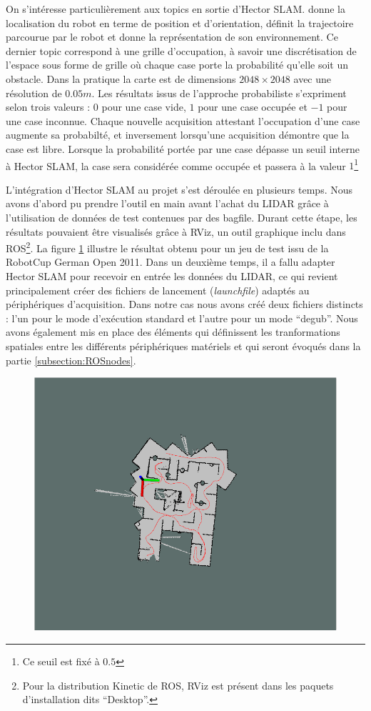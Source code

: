 On s'intéresse particulièrement aux topics en sortie d'\gls{Hector SLAM}. 
 donne la localisation du robot en terme de position et d'orientation,  définit la trajectoire parcourue par le robot et  donne la représentation de son environnement. 
Ce dernier topic correspond à une grille d'occupation, à savoir une discrétisation de l'espace sous forme de grille où chaque case porte la probabilité qu'elle soit un obstacle.
Dans la pratique la carte est de dimensions $2048 \times{2048}$ avec une résolution de $0.05m$. Les résultats issus de l'approche probabiliste s'expriment selon trois valeurs : $0$ pour une case vide, $1$ pour une case occupée et $-1$ pour une case inconnue. 
Chaque nouvelle acquisition attestant l'occupation d'une case augmente sa probabilté, et inversement lorsqu'une acquisition démontre que la case est libre.
Lorsque la probabilité portée par une case dépasse un seuil interne à \gls{Hector SLAM}, la case sera considérée comme occupée et passera à la valeur $1$\footnote{Ce seuil est fixé à $0.5$}

L'intégration d'\gls{Hector SLAM} au projet s'est déroulée en plusieurs temps.
Nous avons d'abord pu prendre l'outil en main avant l'achat du \gls{LIDAR} grâce à l'utilisation de données de test contenues par des \gls{bagfile}. 
Durant cette étape, les résultats pouvaient être visualisés grâce à RViz, un outil graphique inclu dans \gls{ROS}\footnote{Pour la distribution Kinetic de ROS, RViz est présent dans les paquets d'installation dits ``Desktop''\cite{Bib_ROS_install}.}.
La figure \ref{fig:rviz} illustre le résultat obtenu pour un jeu de test issu de la RobotCup German Open 2011. 
Dans un deuxième temps, il a fallu adapter \gls{Hector SLAM} pour recevoir en entrée les données du \gls{LIDAR}, ce qui revient principalement créer des fichiers de lancement (\emph{launchfile})
adaptés au périphériques d'acquisition. Dans notre cas nous avons créé deux fichiers distincts : l'un pour le mode d'exécution standard et l'autre pour un mode ``degub''.
Nous avons également mis en place des éléments qui définissent les tranformations spatiales entre les différents périphériques matériels et qui seront évoqués dans la partie \ref{subsection:ROSnodes}. 

\begin{figure}[h]
  \centering
    \includegraphics[width=.4\linewidth]{figures/rviz}  
  \label{fig:rviz}
\end{figure}

